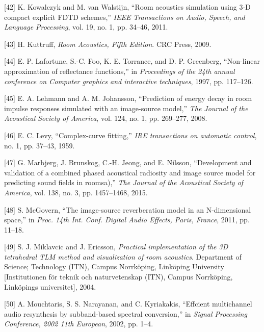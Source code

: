 \documentclass[]{scrreprt}
\begin{document}
\hypertarget{ref-kowalczykux5froomux5f2011}{}
{[}42{]} K. Kowalczyk and M. van Walstijn, ``Room acoustics simulation
using 3-D compact explicit FDTD schemes,'' \emph{IEEE Transactions on
Audio, Speech, and Language Processing}, vol. 19, no. 1, pp. 34--46,
2011.

\hypertarget{ref-kuttruffux5froomux5f2009}{}
{[}43{]} H. Kuttruff, \emph{Room Acoustics, Fifth Edition}. CRC Press,
2009.

\hypertarget{ref-lafortuneux5fnon-linearux5f1997}{}
{[}44{]} E. P. Lafortune, S.-C. Foo, K. E. Torrance, and D. P.
Greenberg, ``Non-linear approximation of reflectance functions,'' in
\emph{Proceedings of the 24th annual conference on Computer graphics and
interactive techniques}, 1997, pp. 117--126.

\hypertarget{ref-lehmannux5fpredictionux5f2008}{}
{[}45{]} E. A. Lehmann and A. M. Johansson, ``Prediction of energy decay
in room impulse responses simulated with an image-source model,''
\emph{The Journal of the Acoustical Society of America}, vol. 124, no.
1, pp. 269--277, 2008.

\hypertarget{ref-levyux5fcomplex-curveux5f1959}{}
{[}46{]} E. C. Levy, ``Complex-curve fitting,'' \emph{IRE transactions
on automatic control}, no. 1, pp. 37--43, 1959.

\hypertarget{ref-marbjergux5fdevelopmentux5f2015}{}
{[}47{]} G. Marbjerg, J. Brunskog, C.-H. Jeong, and E. Nilsson,
``Development and validation of a combined phased acoustical radiosity
and image source model for predicting sound fields in roomsa),''
\emph{The Journal of the Acoustical Society of America}, vol. 138, no.
3, pp. 1457--1468, 2015.

\hypertarget{ref-mcgovernux5fimage-sourceux5f2011}{}
{[}48{]} S. McGovern, ``The image-source reverberation model in an
N-dimensional space,'' in \emph{Proc. 14th Int. Conf. Digital Audio
Effects, Paris, France}, 2011, pp. 11--18.

\hypertarget{ref-miklavcicux5fpracticalux5f2004}{}
{[}49{]} S. J. Miklavcic and J. Ericsson, \emph{Practical implementation
of the 3D tetrahedral TLM method and visualization of room acoustics}.
Department of Science; Technology (ITN), Campus Norrköping, Linköping
University {[}Institutionen för teknik och naturvetenskap (ITN), Campus
Norrköping, Linköpings universitet{]}, 2004.

\hypertarget{ref-mouchtarisux5feffcientux5f2002}{}
{[}50{]} A. Mouchtaris, S. S. Narayanan, and C. Kyriakakis, ``Effcient
multichannel audio resynthesis by subband-based spectral conversion,''
in \emph{Signal Processing Conference, 2002 11th European}, 2002, pp.
1--4.
\end{document}
